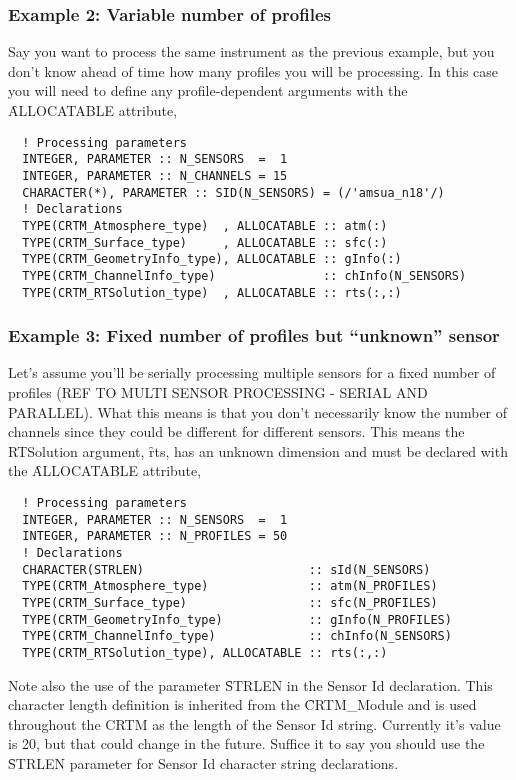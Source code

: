 \subsubsection{Example 2: Variable number of profiles}
\label{sec:declare_step_varprof_ex}
Say you want to process the same instrument as the previous example, but you don't know ahead of time how many profiles you will be processing. In this case you will need to define any profile-dependent arguments with the \f{ALLOCATABLE} attribute,
\begin{ttfamily}
  \begin{verbatim}
  ! Processing parameters
  INTEGER, PARAMETER :: N_SENSORS  =  1
  INTEGER, PARAMETER :: N_CHANNELS = 15
  CHARACTER(*), PARAMETER :: SID(N_SENSORS) = (/'amsua_n18'/)
  ! Declarations
  TYPE(CRTM_Atmosphere_type)  , ALLOCATABLE :: atm(:)
  TYPE(CRTM_Surface_type)     , ALLOCATABLE :: sfc(:)
  TYPE(CRTM_GeometryInfo_type), ALLOCATABLE :: gInfo(:)  
  TYPE(CRTM_ChannelInfo_type)               :: chInfo(N_SENSORS)
  TYPE(CRTM_RTSolution_type)  , ALLOCATABLE :: rts(:,:)\end{verbatim}
\end{ttfamily}

\subsubsection{Example 3: Fixed number of profiles but ``unknown'' sensor}
\label{sec:declare_step_unksensor_ex}
Let's assume you'll be serially processing multiple sensors for a fixed number of profiles (REF TO MULTI SENSOR PROCESSING - SERIAL AND PARALLEL). What this means is that you don't necessarily know the number of channels since they could be different for different sensors. This means the RTSolution argument, \f{rts}, has an unknown dimension and must be declared with the \f{ALLOCATABLE} attribute,
\begin{ttfamily}
  \begin{verbatim}
  ! Processing parameters
  INTEGER, PARAMETER :: N_SENSORS  =  1
  INTEGER, PARAMETER :: N_PROFILES = 50
  ! Declarations
  CHARACTER(STRLEN)                       :: sId(N_SENSORS)
  TYPE(CRTM_Atmosphere_type)              :: atm(N_PROFILES)
  TYPE(CRTM_Surface_type)                 :: sfc(N_PROFILES)
  TYPE(CRTM_GeometryInfo_type)            :: gInfo(N_PROFILES)
  TYPE(CRTM_ChannelInfo_type)             :: chInfo(N_SENSORS)
  TYPE(CRTM_RTSolution_type), ALLOCATABLE :: rts(:,:)\end{verbatim}
\end{ttfamily}
Note also the use of the parameter \f{STRLEN} in the Sensor Id declaration. This character length definition is inherited from the \f{CRTM\_Module} and is used throughout the CRTM as the length of the Sensor Id string. Currently it's value is 20, but that could change in the future. Suffice it to say you should use the \f{STRLEN} parameter for Sensor Id character string declarations.

